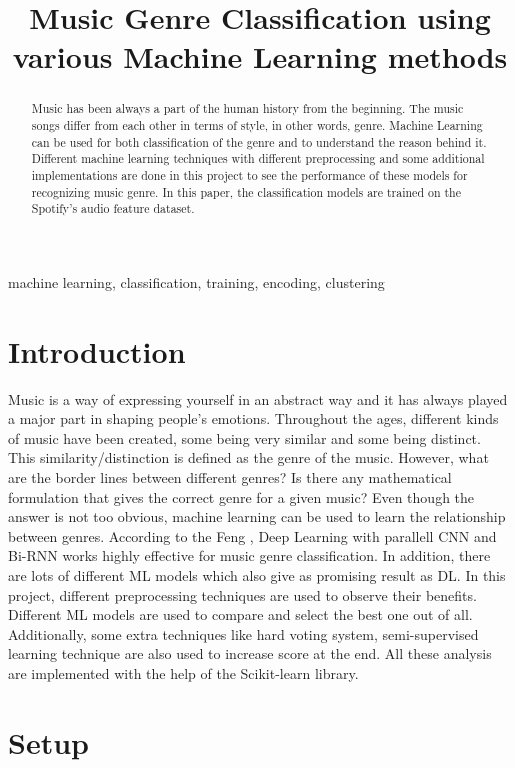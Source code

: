 \documentclass[conference]{IEEEtran}
\date{}
\title{Music Genre Classification using various Machine Learning methods}
\begin{document}
\maketitle
 \begin{abstract}
Music has been always a part of the human history from the beginning. The music songs differ from each other in terms of style, in other words, genre. Machine Learning can be used for both classification of the genre and to understand the reason behind it. Different machine learning techniques with different preprocessing and some additional implementations are done in this project to see the performance of these models for recognizing music genre. In this paper, the classification models are trained on the Spotify's audio feature dataset. 
 \end{abstract}

 \begin{IEEEkeywords}
machine learning, classification, training, encoding, clustering
 \end{IEEEkeywords}

\section{Introduction}
\label{sec:org59be5e5}

Music is a way of expressing yourself in an abstract way and it has always played a major part in shaping people's emotions. Throughout the ages, different kinds of music have been created, some being very similar and some being distinct. This similarity/distinction is defined as the genre of the music. However, what are the border lines between different genres? Is there any mathematical formulation that gives the correct genre for a given music? Even though the answer is not too obvious, machine learning can be used to learn the relationship between genres. According to the Feng \cite{feng2017music}, Deep Learning with parallell CNN and Bi-RNN works highly effective for music genre classification. In addition, there are lots of different ML models which also give as promising result as DL. In this project, different preprocessing techniques are used to observe their benefits. Different ML models are used to compare and select the best one out of all. Additionally, some extra techniques like hard voting system, semi-supervised learning technique are also used to increase score at the end. All these analysis are implemented with the help of the Scikit-learn \cite{scikit-learn} library.

\section{Setup}
\label{sec:orge536d8d}
\end{document}
